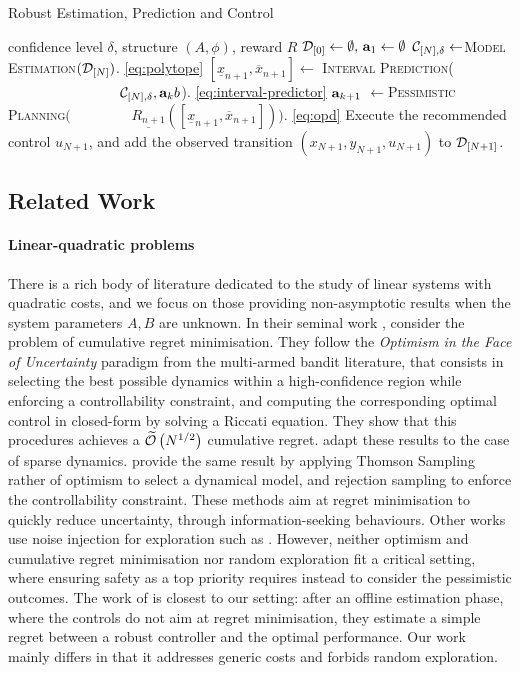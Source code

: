 \documentclass{article}
\begin{document}
\begin{algorithm}[tb]
	\caption{Robust Estimation, Prediction and Control}
	\label{alg:full}
	\begin{algorithmic}
		 confidence level $\delta$, structure $(A,\phi)$, reward $R$
		\STATE $\mathcal{D}_{[0]}\gets\emptyset,\, \mathbf{a}_1\gets\emptyset$
		\STATE $\mathcal{C}_{[N],\delta} \gets$\textsc{Model Estimation}$(\mathcal{D}_{[N]})$. \eqref{eq:polytope}
		\STATE $[\underline{x}_{n+1}, \overline{x}_{n+1}]\gets$ \textsc{Interval Prediction}(
		\STATE $\qquad\qquad\qquad\qquad\mathcal{C}_{[N],\delta}, \mathbf{a}_kb$). \eqref{eq:interval-predictor}
		\ENDFOR
		\STATE $\mathbf{a}_{k+1}$ $\gets$\textsc{Pessimistic Planning}$($
		\STATE$\qquad\qquad\underline{R_{n+1}}([\underline{x}_{n+1}, \overline{x}_{n+1}]))$.  \eqref{eq:opd}
		\ENDFOR
		\STATE Execute the recommended control $u_{N+1}$, and add the observed transition $(x_{N+1}, y_{N+1}, u_{N+1})$ to $\mathcal{D}_{[N+1]}$.
		\ENDFOR
	\end{algorithmic}
\end{algorithm}

\subsection{Related Work}

\paragraph{Linear-quadratic problems} There is a rich body of literature dedicated to the study of linear systems with quadratic costs, and we focus on those providing non-asymptotic results when the system parameters $A, B$ are unknown. In their seminal work \citet{abbasi-yadkori11a}, consider the problem of cumulative regret minimisation. They follow the \emph{Optimism in the Face of Uncertainty} paradigm from the multi-armed bandit literature, that consists in selecting the best possible dynamics within a high-confidence region while enforcing a controllability constraint, and computing the corresponding optimal control in closed-form by solving a Riccati equation. They show that this procedures achieves a $\widetilde{\mathcal{O}}\left(N^{1/2}\right)$ cumulative regret. \citep{Ibrahimi2013,Faradonbeh2017} adapt these results to the case of sparse dynamics. \citet{Ouyang2017,abeille18a} provide the same result by applying Thomson Sampling rather of optimism to select a dynamical model, and rejection sampling to enforce the controllability constraint. These methods aim at regret minimisation to quickly reduce uncertainty, through information-seeking behaviours. Other works use noise injection for exploration such as \citep{Dean2017,Dean2018}. However, neither optimism and cumulative regret minimisation nor random exploration fit a critical setting, where ensuring safety as a top priority requires instead to consider the pessimistic outcomes.
The work of \citet{Dean2017} is closest to our setting: after an offline estimation phase, where the controls do not aim at regret minimisation, they estimate a simple regret between a robust controller and the optimal performance. Our work mainly differs in that it addresses generic costs and forbids random exploration.
\end{document}
